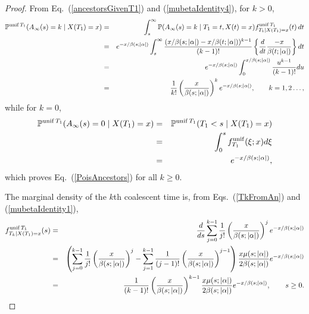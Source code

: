 \documentclass[preprint,12pt]{elsarticle}
\begin{document}
\begin{proof}
From Eq.~(\ref{ancestorsGivenT1}) and (\ref{mubetaIdentity4}), for $k > 0$, 
\begin{eqnarray*}
\mathbb{P}^{{\rm unif}\,T_1}(A_\infty(s) = k \mid X(T_1) = x) 
	& = & \int_s ^\infty \mathbb{P}(A_\infty(s) = k \mid T_1 = t, X(t) = x) f^{{\rm unif}\,T_1} _{T_1 \mid X(T_1) = x} (t)  \,dt \\
	& = & e^{-x/\beta(s; |\alpha|)} \int_s^\infty  \frac{(x/\beta(s; |\alpha|) - x/\beta(t; |\alpha|))^{k - 1}}{(k - 1)!}   \left\{\frac{d}{dt} \frac{-x}{\beta(t; |\alpha|)}\right\} dt \\
	& = & e^{-x/\beta(s; |\alpha|)} \int_0^{x/\beta(s; |\alpha|)}  \frac{u^{k - 1}}{(k - 1)!} du \\
	& = & \frac{1}{k!} \left(\frac{x}{\beta(s; |\alpha|)} \right)^k e^{-x/\beta(s; |\alpha|)}, \qquad k = 1, 2 \ldots,   
\end{eqnarray*}
while for $k = 0$, 
\begin{eqnarray*}
\mathbb{P}^{{\rm unif}\,T_1}(A_\infty(s) = 0 \mid X(T_1) = x) & = & \mathbb{P}^{{\rm unif}\,T_1} (T_1 < s \mid X(T_1) = x) \\
	& = & \int_0^s f^{\rm unif}_{T_1} (\xi ; x) d\xi \\
	& = & e^{-x/\beta(s; |\alpha|)}, 
\end{eqnarray*}
which proves Eq.~(\ref{PoisAncestors}) for all $k \ge 0$.  

The marginal density of the $k$th coalescent time is, from Eqs.~(\ref{TkFromAn}) and (\ref{mubetaIdentity1}),
\begin{eqnarray*}
f_{T_k \mid X(T_1) = x}^{{\rm unif}\,T_1}(s) & = & \frac{d}{ds} \sum_{j = 0}^{k - 1} \frac{1}{j!} \left(\frac{x}{\beta(s; |\alpha|)} \right)^j e^{-x/\beta(s; |\alpha|)} \nonumber \\
	& = & \left(\sum_{j = 0}^{k - 1} \frac{1}{j!} \left(\frac{x}{\beta(s; |\alpha|)} \right)^j - \sum_{j = 1}^{k - 1} \frac{1}{(j - 1)!} \left(\frac{x}{\beta(s; |\alpha|)} \right)^{j - 1} \right)
									\frac{x\mu(s; |\alpha|)}{2\beta(s; |\alpha|)} e^{-x/\beta(s; |\alpha|)} \nonumber \\ 
	& = & \frac{1}{(k - 1)!} \left(\frac{x}{\beta(s; |\alpha|)} \right)^{k  - 1} \frac{x\mu(s; |\alpha|)}{2\beta(s; |\alpha|)} e^{-x/\beta(s; |\alpha|)}, \qquad s \ge 0.  
\end{eqnarray*}


\end{proof}
\end{document}
